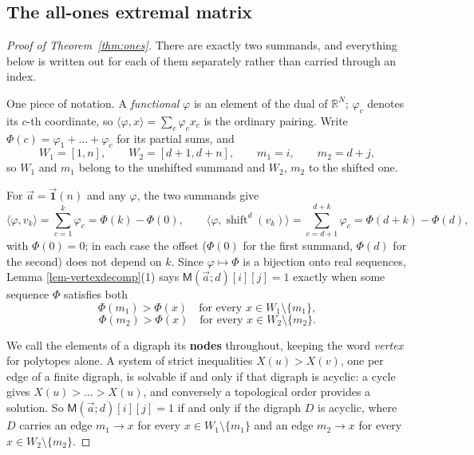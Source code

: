 \documentclass[11pt, a4paper, abstract=yes]{scrartcl}
\theoremstyle{definition}
\theoremstyle{remark}
\theoremstyle{plain}
\newcommand{\shift}{\operatorname{shift}}
\newcommand{\extten}{\mathsf{M}}
\newcommand{\onesvec}{\vec{\mathbf 1}}
\begin{document}
\subsection{The all-ones extremal matrix}
\label{sec-app-ones}
\begin{proof}[Proof of Theorem~\ref{thm:ones}]
There are exactly two summands, and everything below is written out for each of them separately
rather than carried through an index.

One piece of notation. A \emph{functional} \(\varphi\) is an element of the dual of \(\mathbb R^N\);
\(\varphi_c\) denotes its \(c\)-th coordinate, so \(\langle\varphi,x\rangle=\sum_c\varphi_cx_c\)
is the ordinary pairing. Write \(\Phi(c)=\varphi_1+\dots+\varphi_c\) for its partial sums, and
\begin{equation}\label{eq:no-support-functions-2}
  W_1=[1,n],\qquad W_2=[d+1,d+n],\qquad m_1=i,\qquad m_2=d+j ,
\end{equation}
so \(W_1\) and \(m_1\) belong to the unshifted summand and \(W_2\), \(m_2\) to the shifted one.

For \(\vec a=\onesvec(n)\) and any \(\varphi\), the two summands give
\begin{equation}\label{eq:no-support-functions-3}
  \bigl\langle\varphi,v_k\bigr\rangle=\sum_{c=1}^{k}\varphi_c=\Phi(k)-\Phi(0),
  \qquad
  \bigl\langle\varphi,\shift^{d}(v_k)\bigr\rangle=\sum_{c=d+1}^{d+k}\varphi_c=\Phi(d+k)-\Phi(d),
\end{equation}
with \(\Phi(0)=0\); in each case the offset (\(\Phi(0)\) for the first summand, \(\Phi(d)\) for
the second) does not depend on \(k\). Since \(\varphi\mapsto\Phi\) is a bijection onto real
sequences, Lemma \ref{lem-vertexdecomp}(1) says \(\extten(\vec a;d)[i][j]=1\) exactly when some
sequence \(\Phi\) satisfies both
\begin{equation}\label{eq:no-support-functions-4}
  \Phi(m_1)>\Phi(x)\quad\text{for every }x\in W_1\setminus\lbrace m_1\rbrace ,
\end{equation}
\begin{equation}\label{eq:no-support-functions-5}
  \Phi(m_2)>\Phi(x)\quad\text{for every }x\in W_2\setminus\lbrace m_2\rbrace .
\end{equation}

We call the elements of a digraph its \textbf{nodes} throughout, keeping the word \emph{vertex} for polytopes
alone. A system of strict inequalities \(X(u)>X(v)\), one per edge of a finite digraph, is solvable if
and only if that digraph is acyclic: a cycle gives \(X(u)>\dots>X(u)\), and conversely a topological
order provides a solution. So \(\extten(\vec a;d)[i][j]=1\) if and only if the digraph \(D\) is acyclic, where
\(D\) carries an edge \(m_1\to x\) for every \(x\in W_1\setminus\lbrace m_1\rbrace\) and an edge
\(m_2\to x\) for every \(x\in W_2\setminus\lbrace m_2\rbrace\).


\end{proof}
\end{document}
